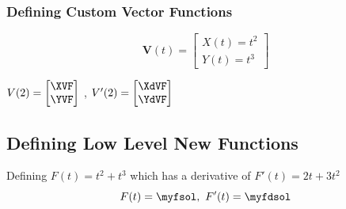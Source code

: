 \documentclass{article}
\begin{document}
	\subsubsection{Defining Custom Vector Functions}
	\[
		\mathbf{V}(t) = \begin{bmatrix}
							X(t) = t^2 \\ 
							Y(t) = t^3
						\end{bmatrix}
	\]
	\begin{center}
		$
			V(2) =  \begin{bmatrix}
						\XVF \\ \YVF
					\end{bmatrix}			
		$ ,
		$
			V'(2) =  \begin{bmatrix}
						\XdVF \\ \YdVF
					 \end{bmatrix}			
		$
	\end{center}
	
	\pagebreak
	
	\subsection{Defining Low Level New Functions}
	Defining $F(t) = t^2 + t^3$ which has a derivative 			of $F'(t) = 2t + 3t^2$ 
	\[ F(t) = \myfsol,~ F'(t) = \myfdsol \]
\end{document}
